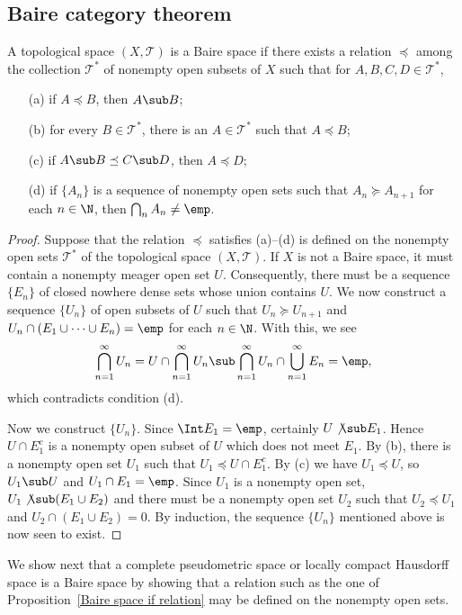 \subsection{Baire category theorem}
\begin{proposition}\label{Baire space if relation}
A topological space $(X,\mathcal{T})$ is a Baire space if there exists a relation $\preceq$ among the collection $\mathcal{T}^*$ of nonempty open subsets of $X$ such that for $A,B,C,D\in\mathcal{T}^*$,
\begin{itemize}
\item[(a)] if $A\preceq B$, then $A\sub B$;
\item[(b)] for every $B\in\mathcal{T}^*$, there is an $A\in\mathcal{T}^*$ such that $A\preceq B$;
\item[(c)] if $A\sub B\preceq C\sub D$, then $A\preceq D$;
\item[(d)] if $\{A_n\}$ is a sequence of nonempty open sets such that $A_n\succeq A_{n+1}$ for each $n\in\N$, then $\bigcap_nA_n\neq\emp$.
\end{itemize}
\end{proposition}
\begin{proof}
Suppose that the relation $\preceq$ satisfies (a)--(d) is defined on the nonempty open sets $\mathcal{T}^*$ of the topological space $(X,\mathcal{T})$. If $X$ is not a Baire space, it must contain a nonempty meager open set $U$. Consequently, there must be a sequence $\{E_n\}$ of closed nowhere dense sets whose union contains $U$. We now construct a sequence $\{U_n\}$ of open subsets of $U$ such that $U_n\succeq U_{n+1}$ and $U_n\cap(E_1\cup\cdots\cup E_n)=\emp$ for each $n\in\N$. With this, we see
\[\bigcap_{n=1}^{\infty}U_n=U\cap\bigcap_{n=1}^{\infty}U_n\sub\bigcap_{n=1}^{\infty}U_n\cap\bigcup_{n=1}^{\infty}E_n=\emp,\]
which contradicts condition (d).\par
Now we construct $\{U_n\}$. Since $\Int E_1=\emp$, certainly $U\not\sub E_1$. Hence $U\cap E_1^c$ is a nonempty open subset of $U$ which does not meet $E_1$. By (b), there is a nonempty open set $U_1$ such that $U_1\preceq U\cap E_1^c$. By (c) we have $U_1\preceq U$, so $U_1\sub U$ and $U_1\cap E_1=\emp$. Since $U_1$ is a nonempty open set, $U_1\not\sub(E_1\cup E_2)$ and there must be a nonempty open set $U_2$ such that $U_2\preceq U_1$ and $U_2\cap (E_1\cup E_2)=0$. By induction, the sequence $\{U_n\}$ mentioned above is now seen to exist.
\end{proof}
We show next that a complete pseudometric space or locally compact Hausdorff space is a Baire space by showing that a relation such as the one of Proposition~\ref{Baire space if relation} may be defined on the nonempty open sets.
